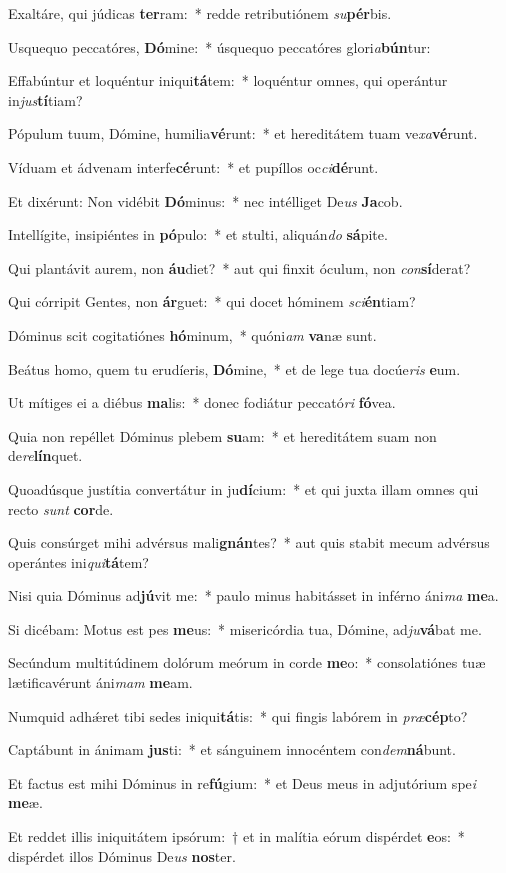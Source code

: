 \item Exaltáre, qui júdicas \textbf{ter}ram:~* redde retributiónem \textit{su}\textbf{pér}bis.
\item Usquequo peccatóres, \textbf{Dó}mine:~* úsquequo peccatóres glori\textit{a}\textbf{bún}tur:
\item Effabúntur et loquéntur iniqui\textbf{tá}tem:~* loquéntur omnes, qui operántur in\textit{jus}\textbf{tí}tiam?
\item Pópulum tuum, Dómine, humilia\textbf{vé}runt:~* et hereditátem tuam ve\textit{xa}\textbf{vé}runt.
\item Víduam et ádvenam interfe\textbf{cé}runt:~* et pupíllos oc\textit{ci}\textbf{dé}runt.
\item Et dixérunt: Non vidébit \textbf{Dó}minus:~* nec intélliget De\textit{us} \textbf{Ja}cob.
\item Intellígite, insipiéntes in \textbf{pó}pulo:~* et stulti, aliquán\textit{do} \textbf{sá}pite.
\item Qui plantávit aurem, non \textbf{áu}diet?~* aut qui finxit óculum, non \textit{con}\textbf{sí}derat?
\item Qui córripit Gentes, non \textbf{ár}guet:~* qui docet hóminem \textit{sci}\textbf{én}tiam?
\item Dóminus scit cogitatiónes \textbf{hó}minum,~* quóni\textit{am} \textbf{va}næ sunt.
\item Beátus homo, quem tu erudíeris, \textbf{Dó}mine,~* et de lege tua docúe\textit{ris} \textbf{e}um.
\item Ut mítiges ei a diébus \textbf{ma}lis:~* donec fodiátur peccató\textit{ri} \textbf{fó}vea.
\item Quia non repéllet Dóminus plebem \textbf{su}am:~* et hereditátem suam non de\textit{re}\textbf{lín}quet.
\item Quoadúsque justítia convertátur in ju\textbf{dí}cium:~* et qui juxta illam omnes qui recto \textit{sunt} \textbf{cor}de.
\item Quis consúrget mihi advérsus mali\textbf{gnán}tes?~* aut quis stabit mecum advérsus operántes ini\textit{qui}\textbf{tá}tem?
\item Nisi quia Dóminus ad\textbf{jú}vit me:~* paulo minus habitásset in inférno áni\textit{ma} \textbf{me}a.
\item Si dicébam: Motus est pes \textbf{me}us:~* misericórdia tua, Dómine, ad\textit{ju}\textbf{vá}bat me.
\item Secúndum multitúdinem dolórum meórum in corde \textbf{me}o:~* consolatiónes tuæ lætificavérunt áni\textit{mam} \textbf{me}am.
\item Numquid adhǽret tibi sedes iniqui\textbf{tá}tis:~* qui fingis labórem in \textit{præ}\textbf{cép}to?
\item Captábunt in ánimam \textbf{jus}ti:~* et sánguinem innocéntem con\textit{dem}\textbf{ná}bunt.
\item Et factus est mihi Dóminus in re\textbf{fú}gium:~* et Deus meus in adjutórium spe\textit{i} \textbf{me}æ.
\item Et reddet illis iniquitátem ipsórum:~† et in malítia eórum dispérdet \textbf{e}os:~* dispérdet illos Dóminus De\textit{us} \textbf{nos}ter.

